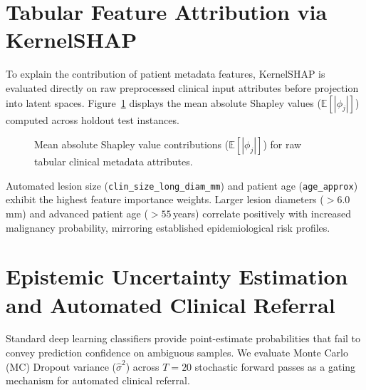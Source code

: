 \documentclass[12pt,a4paper]{report}
\begin{document}
	\section{Tabular Feature Attribution via KernelSHAP}
	To explain the contribution of patient metadata features, KernelSHAP is evaluated directly on raw preprocessed clinical input attributes before projection into latent spaces. Figure~\ref{fig:shap_summary} displays the mean absolute Shapley values ($\mathbb{E}[|\phi_j|]$) computed across holdout test instances.
	
	\begin{figure}[htbp]
		\centering
		\caption{Mean absolute Shapley value contributions ($\mathbb{E}[|\phi_j|]$) for raw tabular clinical metadata attributes.}
		\label{fig:shap_summary}
	\end{figure}
	
	Automated lesion size (\texttt{clin\_size\_long\_diam\_mm}) and patient age (\texttt{age\_approx}) exhibit the highest feature importance weights. Larger lesion diameters ($>6.0$\,mm) and advanced patient age ($>55$\,years) correlate positively with increased malignancy probability, mirroring established epidemiological risk profiles.
	
	\section{Epistemic Uncertainty Estimation and Automated Clinical Referral}
	Standard deep learning classifiers provide point-estimate probabilities that fail to convey prediction confidence on ambiguous samples. We evaluate Monte Carlo (MC) Dropout variance ($\hat{\sigma}^2$) across $T=20$ stochastic forward passes as a gating mechanism for automated clinical referral.
	
\end{document}
